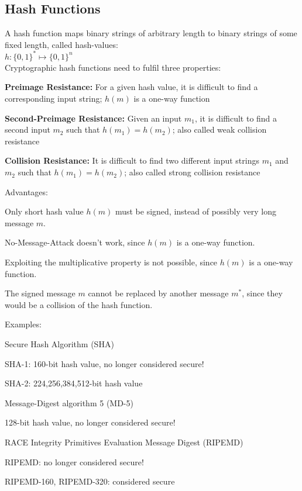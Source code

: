 \subsection{Hash Functions}
A hash function maps binary strings of arbitrary length to binary strings of some fixed length, called hash-values:\\ $h: \{0,1\}^* \mapsto \{0,1\}^n$\\
Cryptographic hash functions need to fulfil three properties:
\begin{liste}
	\item [\-] \textbf{Preimage Resistance:} For a given hash value, it is difficult to find a corresponding input string; $h(m)$ is a one-way function
	\item [\-] \textbf{Second-Preimage Resistance:} Given an input $m_1$, it is difficult to find a second input $m_2$ such that $h(m_1)=h(m_2)$; also called weak collision resistance
	\item [\-] \textbf{Collision Resistance:} It is difficult to find two different input strings $m_1$ and $m_2$ such that $h(m_1)=h(m_2)$; also called strong collision resistance
\end{liste}
Advantages:
\begin{liste}
	\item Only short hash value $h(m)$ must be signed, instead of possibly very long message $m$.
	\item No-Message-Attack doesn't work, since $h(m)$ is a one-way function.
	\item Exploiting the multiplicative property is not possible, since $h(m)$ is a one-way function.
	\item The signed message $m$ cannot be replaced by another message $m^*$, since they would be a collision of the hash function.
\end{liste}
Examples:
\begin{liste}
	\item Secure Hash Algorithm (SHA)
	\begin{liste}
		\item SHA-1: 160-bit hash value, no longer considered secure!
		\item SHA-2: 224,256,384,512-bit hash value
	\end{liste}
	\item Message-Digest algorithm 5 (MD-5)
	\begin{liste}
		\item 128-bit hash value, no longer considered secure!
	\end{liste}
	\item RACE Integrity Primitives Evaluation Message Digest (RIPEMD)
	\begin{liste}
		\item RIPEMD: no longer considered secure!
		\item RIPEMD-160, RIPEMD-320: considered secure
	\end{liste}
\end{liste}

